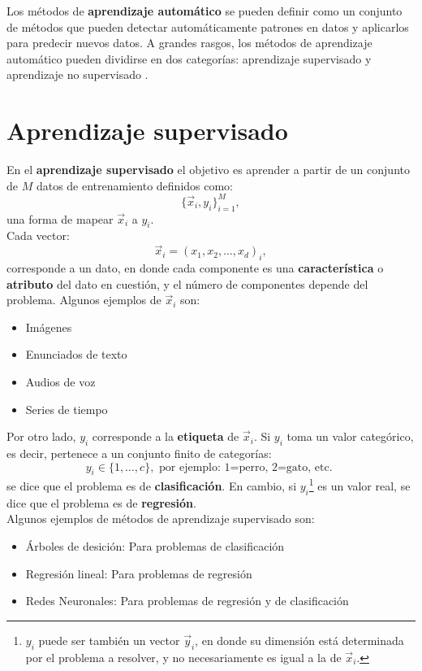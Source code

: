 Los métodos de \textbf{aprendizaje automático} se pueden definir como un conjunto de métodos que pueden detectar automáticamente patrones en datos y aplicarlos para predecir nuevos datos. A grandes rasgos, los métodos de aprendizaje automático pueden dividirse en dos categorías: aprendizaje supervisado y aprendizaje no supervisado \cite{murphy:2013}.

\section{Aprendizaje supervisado}
En el \textbf{aprendizaje supervisado} el objetivo es aprender a partir de un conjunto de $M$ datos de entrenamiento definidos como:
\begin{equation}
\{\vec{x}_i, y_i\}_{i=1}^{M},
\end{equation}
una forma de mapear $\vec{x}_i$ a $y_i$.
\\
Cada vector:
\begin{equation}
  \label{eq:trainset}
\vec{x}_i = (x_1,x_2, \dots , x_d)_i,
\end{equation}
corresponde a un dato, en donde cada componente es una \textbf{característica} o \textbf{atributo} del dato en cuestión, y el número de componentes depende del problema. Algunos ejemplos de $\vec{x}_i$ son:
\begin{itemize}[label=\textcolor{CTtitle}{\textbullet}]
\item Imágenes
\item Enunciados de texto
\item Audios de voz
\item Series de tiempo
\end{itemize}

Por otro lado, $y_i$ corresponde a la \textbf{etiqueta} de $\vec{x}_i$. Si $y_i$ toma un valor categórico, es decir, pertenece a un conjunto finito de categorías:
$$y_i \in \{1,\dots,c\}, \text{  por ejemplo: 1=perro, 2=gato, etc. }$$ 
se dice que el problema es de \textbf{clasificación}.
En cambio, si $y_i$\footnote{$y_i$ puede ser también un vector $\vec{y}_i$, en donde su dimensión está determinada por el problema a resolver, y no necesariamente es igual a la de $\vec{x}_i$.} es un valor real, se dice que el problema es de \textbf{regresión}.
\\

Algunos ejemplos de métodos de aprendizaje supervisado son:
\begin{itemize}[label=\textcolor{CTtitle}{\textbullet}]
\item Árboles de desición: Para problemas de clasificación
\item Regresión lineal: Para problemas de regresión
\item Redes Neuronales: Para problemas de regresión y de clasificación
\end{itemize}

